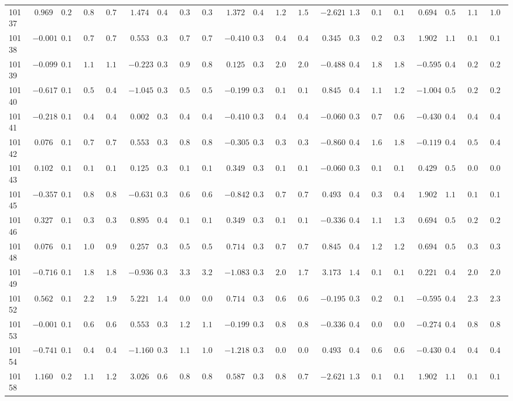 \documentclass[6pt]{article}
\begin{document}
\begin{landscape}
{\begin{longtable}{lrrrrrrrrrrrrrrrrrrrr}
10137&$ 0.969$&$0.240$&$0.854$&$0.798$&$ 1.474$&$0.455$&$0.324$&$0.317$&$ 1.372$&$0.492$&$1.290$&$1.524$&$-2.621$&$1.373$&$0.129$&$0.145$&$ 0.694$&$0.577$&$1.150$&$1.098$\tabularnewline
10138&$-0.001$&$0.159$&$0.790$&$0.756$&$ 0.553$&$0.395$&$0.711$&$0.716$&$-0.410$&$0.330$&$0.489$&$0.492$&$ 0.345$&$0.396$&$0.297$&$0.304$&$ 1.902$&$1.193$&$0.177$&$0.179$\tabularnewline
10139&$-0.099$&$0.157$&$1.163$&$1.175$&$-0.223$&$0.334$&$0.920$&$0.888$&$ 0.125$&$0.336$&$2.016$&$2.018$&$-0.488$&$0.420$&$1.866$&$1.854$&$-0.595$&$0.444$&$0.269$&$0.266$\tabularnewline
10140&$-0.617$&$0.157$&$0.514$&$0.490$&$-1.045$&$0.346$&$0.503$&$0.513$&$-0.199$&$0.330$&$0.115$&$0.115$&$ 0.845$&$0.472$&$1.194$&$1.258$&$-1.004$&$0.524$&$0.275$&$0.277$\tabularnewline
10141&$-0.218$&$0.154$&$0.484$&$0.470$&$ 0.002$&$0.349$&$0.430$&$0.449$&$-0.410$&$0.330$&$0.483$&$0.485$&$-0.060$&$0.384$&$0.718$&$0.632$&$-0.430$&$0.428$&$0.455$&$0.450$\tabularnewline
10142&$ 0.076$&$0.162$&$0.798$&$0.791$&$ 0.553$&$0.395$&$0.872$&$0.821$&$-0.305$&$0.330$&$0.364$&$0.365$&$-0.860$&$0.496$&$1.680$&$1.816$&$-0.119$&$0.426$&$0.500$&$0.494$\tabularnewline
10143&$ 0.102$&$0.163$&$0.125$&$0.127$&$ 0.125$&$0.358$&$0.118$&$0.119$&$ 0.349$&$0.345$&$0.140$&$0.137$&$-0.060$&$0.384$&$0.136$&$0.149$&$ 0.429$&$0.504$&$0.028$&$0.029$\tabularnewline
10145&$-0.357$&$0.154$&$0.864$&$0.851$&$-0.631$&$0.324$&$0.606$&$0.600$&$-0.842$&$0.347$&$0.785$&$0.731$&$ 0.493$&$0.411$&$0.398$&$0.413$&$ 1.902$&$1.193$&$0.177$&$0.179$\tabularnewline
10146&$ 0.327$&$0.176$&$0.384$&$0.356$&$ 0.895$&$0.420$&$0.102$&$0.108$&$ 0.349$&$0.345$&$0.135$&$0.136$&$-0.336$&$0.401$&$1.140$&$1.388$&$ 0.694$&$0.577$&$0.282$&$0.288$\tabularnewline
10148&$ 0.076$&$0.162$&$1.010$&$0.904$&$ 0.257$&$0.370$&$0.588$&$0.542$&$ 0.714$&$0.373$&$0.766$&$0.739$&$ 0.845$&$0.472$&$1.200$&$1.263$&$ 0.694$&$0.577$&$0.301$&$0.323$\tabularnewline
10149&$-0.716$&$0.161$&$1.830$&$1.804$&$-0.936$&$0.337$&$3.322$&$3.288$&$-1.083$&$0.371$&$2.091$&$1.735$&$ 3.173$&$1.487$&$0.122$&$0.133$&$ 0.221$&$0.462$&$2.008$&$2.064$\tabularnewline
10152&$ 0.562$&$0.194$&$2.241$&$1.987$&$ 5.221$&$1.494$&$0.080$&$0.089$&$ 0.714$&$0.373$&$0.625$&$0.606$&$-0.195$&$0.390$&$0.201$&$0.184$&$-0.595$&$0.444$&$2.314$&$2.363$\tabularnewline
10153&$-0.001$&$0.159$&$0.675$&$0.682$&$ 0.553$&$0.395$&$1.292$&$1.194$&$-0.199$&$0.330$&$0.880$&$0.877$&$-0.336$&$0.401$&$0.073$&$0.082$&$-0.274$&$0.422$&$0.853$&$0.854$\tabularnewline
10154&$-0.741$&$0.162$&$0.489$&$0.499$&$-1.160$&$0.358$&$1.153$&$1.092$&$-1.218$&$0.391$&$0.078$&$0.091$&$ 0.493$&$0.411$&$0.679$&$0.655$&$-0.430$&$0.428$&$0.455$&$0.450$\tabularnewline
10158&$ 1.160$&$0.269$&$1.112$&$1.220$&$ 3.026$&$0.623$&$0.865$&$0.850$&$ 0.587$&$0.361$&$0.827$&$0.784$&$-2.621$&$1.373$&$0.129$&$0.145$&$ 1.902$&$1.193$&$0.177$&$0.179$\tabularnewline
\hline
\end{longtable}}\end{landscape}
\end{document}
